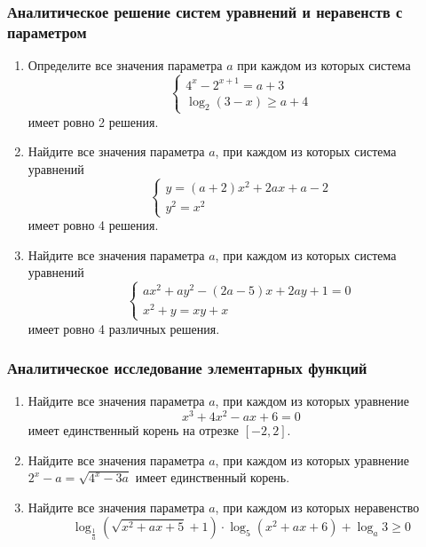 \documentclass[12pt]{article}
\begin{document}
\subsubsection{Аналитическое решение систем уравнений и неравенств с параметром}
\begin{enumerate}[start=1,label={\itshape\bfseries \arabic*.}]
    \item Определите все значения параметра $a$ при каждом из которых система
    $$\begin{cases} 4^x - 2^{x + 1} = a + 3 \\ \log_2{(3 - x)} \ge a + 4\end{cases}$$
    имеет ровно 2 решения.
    \item Найдите все значения параметра $a$, при каждом из которых система уравнений
    $$\begin{cases} y = (a + 2)x^2 + 2ax + a - 2 \\ y^2  = x^2 \end{cases}$$
    имеет ровно 4 решения.
    \item Найдите все значения параметра $a$, при каждом из которых система уравнений
    $$\begin{cases} ax^2 + ay^2 - (2a - 5)x + 2ay + 1 = 0 \\ x^2 + y = xy + x\end{cases}$$
    имеет ровно 4 различных решения.
\end{enumerate}
\subsubsection{Аналитическое исследование элементарных функций}
\begin{enumerate}[start=1,label={\itshape\bfseries \arabic*.}]
    \item Найдите все значения параметра $a$, при каждом из которых уравнение
    $$x^3 + 4x^2 - ax + 6 = 0$$
    имеет единственный корень на отрезке $[-2, 2]$.
    \item Найдите все значения параметра $a$, при каждом из которых уравнение $2^x - a = \sqrt{4^x - 3a}$ имеет единственный корень.
    \item Найдите все значения параметра $a$, при каждом из которых неравенство
    $$\log_{\frac{1}{a}}(\sqrt{x^2 + ax + 5} + 1) \cdot \log_5(x^2 + ax + 6) + \log_a{3} \ge 0$$

\end{enumerate}

\end{document}
